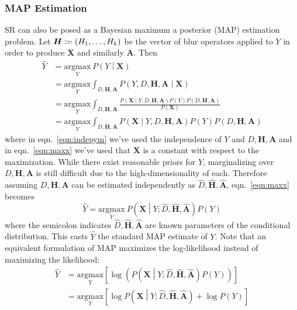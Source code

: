 \subsubsection{MAP Estimation}
SR can also be posed as a Bayesian maximum a posterior (MAP) estimation problem.
%
Let $\bm{H} \coloneqq \left( H_1, \mathellipsis, H_k \right)$ be the vector of blur operators applied to $Y$ in order to produce $\bm{X}$ and similarly $\bm{A}$.
%
Then
\begin{align}
    \hat{Y} &= \underset{Y}{\text{argmax}}~P\left( Y \middle| \bm{X} \right) \nonumber \\
    &= \underset{Y}{\text{argmax}} \int_{D, \bm{H}, \bm{A}} P\left( Y, D, \bm{H}, \bm{A} \middle| \bm{X}\right) \nonumber \\
    &= \underset{Y}{\text{argmax}} \int_{D, \bm{H}, \bm{A}} \frac{P\left(\bm{X} \middle| Y, D, \bm{H}, \bm{A} \right)P(Y) P(D, \bm{H}, \bm{A})}{P(\bm{X})}\label{eqn:indepym} \\
    &= \underset{Y}{\text{argmax}} \int_{D, \bm{H}, \bm{A}} P\left(\bm{X} \middle| Y, D, \bm{H}, \bm{A} \right)P(Y) P(D, \bm{H}, \bm{A}) \label{eqn:maxx}
\end{align}
where in eqn.~\eqref{eqn:indepym} we've used the independence of $Y$ and $D, \bm{H}, \bm{A}$\cite{Hardie1997} and in eqn.~\eqref{eqn:maxx} we've used that $\bm{X}$ is a constant with respect to the maximization.
%
While there exist reasonable priors for $Y$, marginalizing over $D, \bm{H}, \bm{A}$ is still difficult due to the high-dimensionality of each.
%
Therefore assuming $D, \bm{H}, \bm{A}$ can be estimated independently as $\hat{D}, \hat{\bm{H}}, \hat{\bm{A}}$, eqn.~\eqref{eqn:maxx} becomes
\begin{equation}
    \hat{Y} = \underset{Y}{\text{argmax}}~P\left(\bm{X} \middle| Y; \hat{D}, \hat{\bm{H}}, \hat{\bm{A}} \right) P(Y)
    \label{eqn:map}
\end{equation}
where the semicolon indicates $\hat{D}, \hat{\bm{H}}, \hat{\bm{A}}$ are known parameters of the conditional distribution.
%
This casts $\hat{Y}$ the standard MAP estimate of $Y$.
%
Note that an equivalent formulation of MAP maximizes the log-likelihood instead of maximizing the likelihood:
\begin{align}
    \hat{Y} &= \underset{Y}{\text{argmax}}\left[ \log\left( P\left(\bm{X} \middle| Y; \hat{D},  \hat{\bm{H}}, \hat{\bm{A}}\right) P(Y) \right) \right]  \nonumber \\
    &=  \underset{Y}{\text{argmax}}\left[ \log{P\left(\bm{X} \middle| Y; \hat{D},  \hat{\bm{H}}, \hat{\bm{A}} \right)} + \log{P(Y)} \right]
    \label{eqn:logmap}
\end{align}
